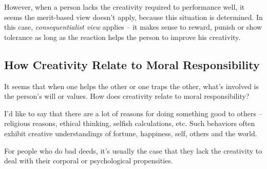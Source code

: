However, when a person lacks the creativity required to performance well, it seems the merit-based view doesn't apply, because this situation is determined. In this case, \emph{consequentialist view} applies -- it makes sense to reward, punish or show tolerance as long as the reaction helps the person to improve his creativity.

\subsection{How Creativity Relate to Moral Responsibility}

It seems that when one helps the other or one traps the other, what's involved is the person's will or values. How does creativity relate to moral responsibility?

I'd like to say that there are a lot of reasons for doing something good to others -- religious reasons, ethical thinking, selfish calculations, etc. Such behaviors often exhibit creative understandings of fortune, happiness, self, others and the world.

For people who do bad deeds, it's usually the case that they lack the creativity to deal with their corporal or psychological propensities.

